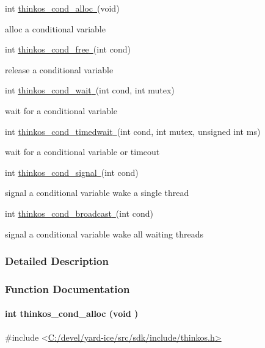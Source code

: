 {{int
}{\protect\hyperlink{h.1ci93xb}{thinkos\_cond\_alloc}}{\protect\hyperlink{h.1ci93xb}{~}}{(void)}

{alloc a conditional variable }

{int
}{\protect\hyperlink{h.3whwml4}{thinkos\_cond\_free}}{\protect\hyperlink{h.3whwml4}{~}}{(int
cond)}

{release a conditional variable }

{int
}{\protect\hyperlink{h.2bn6wsx}{thinkos\_cond\_wait}}{\protect\hyperlink{h.2bn6wsx}{~}}{(int
cond, int mutex)}

{wait for a conditional variable }

{int
}{\protect\hyperlink{h.qsh70q}{thinkos\_cond\_timedwait}}{\protect\hyperlink{h.qsh70q}{~}}{(int
cond, int mutex, unsigned int ms)}

{wait for a conditional variable or timeout }

{int
}{\protect\hyperlink{h.3as4poj}{thinkos\_cond\_signal}}{\protect\hyperlink{h.3as4poj}{~}}{(int
cond)}

{signal a conditional variable wake a single thread }

{int
}{\protect\hyperlink{h.1pxezwc}{thinkos\_cond\_broadcast}}{\protect\hyperlink{h.1pxezwc}{~}}{(int
cond)}

{signal a conditional variable wake all waiting threads }

{}

\subsubsection{\texorpdfstring{{Detailed
Description}}{Detailed Description}}\label{detailed-description-3}

{}

{}

\subsubsection{\texorpdfstring{{Function
Documentation}}{Function Documentation}}\label{function-documentation-3}

\paragraph{\texorpdfstring{{int thinkos\_cond\_alloc (void
)}}{int thinkos\_cond\_alloc (void )}}\label{int-thinkos_cond_alloc-void}

{}

{\#include
\textless{}}{\protect\hyperlink{h.pkwqa1}{C:/devel/yard-ice/src/sdk/include/thinkos.h}}{\protect\hyperlink{h.pkwqa1}{\textgreater{}}}

}
